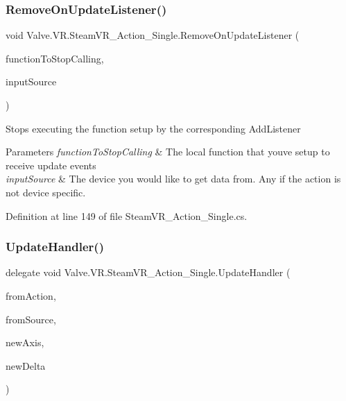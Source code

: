 \subsubsection{\texorpdfstring{RemoveOnUpdateListener()}{RemoveOnUpdateListener()}}
{\footnotesize\ttfamily void Valve.\+V\+R.\+Steam\+V\+R\+\_\+\+Action\+\_\+\+Single.\+Remove\+On\+Update\+Listener (\begin{DoxyParamCaption}\item[{\mbox{\hyperlink{class_valve_1_1_v_r_1_1_steam_v_r___action___single_a1514666eabcafba498274e8d6cee2a40}{Update\+Handler}}}]{function\+To\+Stop\+Calling,  }\item[{\mbox{\hyperlink{namespace_valve_1_1_v_r_a82e5bf501cc3aa155444ee3f0662853f}{Steam\+V\+R\+\_\+\+Input\+\_\+\+Sources}}}]{input\+Source }\end{DoxyParamCaption})}



Stops executing the function setup by the corresponding Add\+Listener 


\begin{DoxyParams}{Parameters}
{\em function\+To\+Stop\+Calling} & The local function that you\textquotesingle{}ve setup to receive update events\\
\hline
{\em input\+Source} & The device you would like to get data from. Any if the action is not device specific.\\
\hline
\end{DoxyParams}


Definition at line 149 of file Steam\+V\+R\+\_\+\+Action\+\_\+\+Single.\+cs.

\mbox{\label{class_valve_1_1_v_r_1_1_steam_v_r___action___single_a1514666eabcafba498274e8d6cee2a40}} 
\subsubsection{\texorpdfstring{UpdateHandler()}{UpdateHandler()}}
{\footnotesize\ttfamily delegate void Valve.\+V\+R.\+Steam\+V\+R\+\_\+\+Action\+\_\+\+Single.\+Update\+Handler (\begin{DoxyParamCaption}\item[{\mbox{\hyperlink{class_valve_1_1_v_r_1_1_steam_v_r___action___single}{Steam\+V\+R\+\_\+\+Action\+\_\+\+Single}}}]{from\+Action,  }\item[{\mbox{\hyperlink{namespace_valve_1_1_v_r_a82e5bf501cc3aa155444ee3f0662853f}{Steam\+V\+R\+\_\+\+Input\+\_\+\+Sources}}}]{from\+Source,  }\item[{float}]{new\+Axis,  }\item[{float}]{new\+Delta }\end{DoxyParamCaption})}



